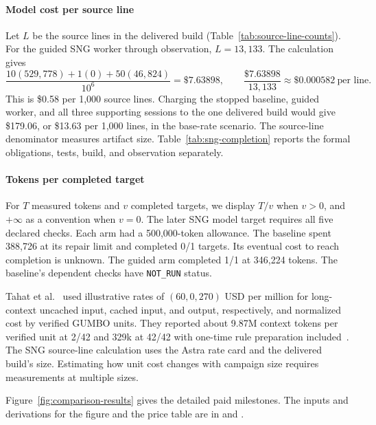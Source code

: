 \paragraph{Model cost per source line}
Let \(L\) be the source lines in the delivered build (Table~\ref{tab:source-line-counts}). For the guided SNG worker through observation, \(L=13{,}133\). The calculation gives
\[
\frac{10(529{,}778)+1(0)+50(46{,}824)}{10^6}
=\$7.63898,\qquad
\frac{\$7.63898}{13{,}133}\approx \$0.000582\ \text{per line}.
\]
This is \$0.58 per 1,000 source lines. Charging the stopped baseline, guided worker, and all three supporting sessions to the one delivered build would give \$179.06, or \$13.63 per 1,000 lines, in the base-rate scenario. The source-line denominator measures artifact size. Table~\ref{tab:sng-completion} reports the formal obligations, tests, build, and observation separately.

\paragraph{Tokens per completed target}
For \(T\) measured tokens and \(v\) completed targets, we display \(T/v\) when \(v>0\), and \(+\infty\) as a convention when \(v=0\). The later SNG model target requires all five declared checks. Each arm had a 500,000-token allowance. The baseline spent 388,726 at its repair limit and completed 0/1 targets. Its eventual cost to reach completion is unknown. The guided arm completed 1/1 at 346,224 tokens. The baseline's dependent checks have \texttt{NOT\_RUN} status.

Tahat et al.~\cite{tahat2026scp} used illustrative rates of \((60,0,270)\) USD per million for long-context uncached input, cached input, and output, respectively, and normalized cost by verified GUMBO units. They reported about 9.87M context tokens per verified unit at 2/42 and 329k at 42/42 with one-time rule preparation included~\cite{tahat2026scp,tahat2026dascslides}. The SNG source-line calculation uses the Astra rate card and the delivered build's size. Estimating how unit cost changes with campaign size requires measurements at multiple sizes.

Figure~\ref{fig:comparison-results} gives the detailed paid milestones. The inputs and derivations for the figure and the price table are in  and .


